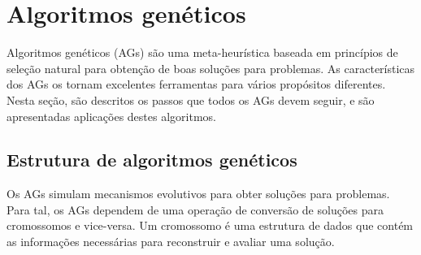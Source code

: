 \section{Algoritmos genéticos}

Algoritmos genéticos (AGs) são uma meta-heurística baseada em princípios de seleção natural para obtenção de boas soluções para problemas. As características dos AGs os tornam excelentes ferramentas para vários propósitos diferentes. Nesta seção, são descritos os passos que todos os AGs devem seguir, e são apresentadas aplicações destes algoritmos.

\subsection{Estrutura de algoritmos genéticos}

Os AGs simulam mecanismos evolutivos para obter soluções para problemas. Para tal, os AGs dependem de uma operação de conversão de soluções para cromossomos e vice-versa. Um cromossomo é uma estrutura de dados que contém as informações necessárias para reconstruir e avaliar uma solução.